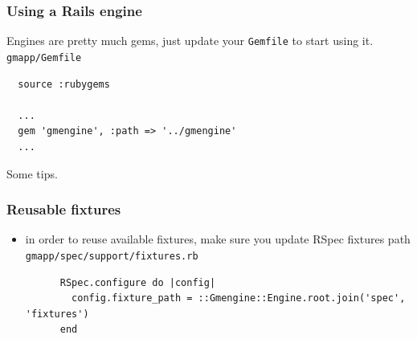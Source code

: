 \documentclass[compress]{beamer}
\begin{document}
\begin{frame}[fragile]
\frametitle{Using a Rails engine}
Engines are pretty much gems, just update your \texttt{Gemfile} to start using it.
\\
\small\texttt{gmapp/Gemfile}
\begin{verbatim}
  source :rubygems

  ...
  gem 'gmengine', :path => '../gmengine'
  ...
\end{verbatim}
\end{frame}

\begin{frame}
  \begin{center}
  \huge Some tips.
  \end{center}
\end{frame}

\begin{frame}[fragile]
\frametitle{Reusable fixtures}
\begin{itemize}
  \item in order to reuse available fixtures, make sure you update RSpec fixtures path
    \\
    \texttt{gmapp/spec/support/fixtures.rb}
    \begin{verbatim}
      RSpec.configure do |config|
        config.fixture_path = ::Gmengine::Engine.root.join('spec', 'fixtures')
      end
    \end{verbatim}
\end{itemize}
\end{frame}
\end{document}
